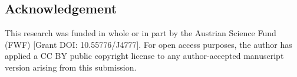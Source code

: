 \documentclass[a4paper,12pt,reqno]{amsart}
\theoremstyle{definition}
\begin{document}
\subsection*{Acknowledgement}

This research was funded in whole or in part by the Austrian Science Fund (FWF) [Grant DOI: 10.55776/J4777]. For open access purposes, the author has applied a CC BY public copyright license to any author-accepted manuscript version arising from this submission. 



\end{document}
